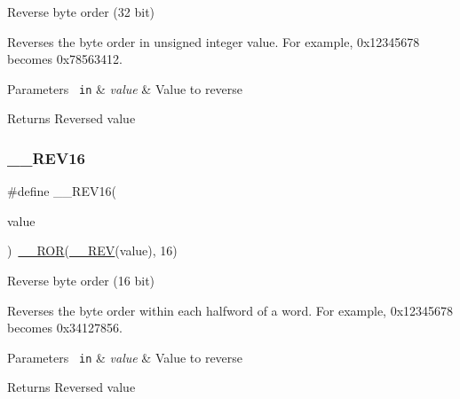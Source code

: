 Reverse byte order (32 bit) 

Reverses the byte order in unsigned integer value. For example, 0x12345678 becomes 0x78563412. 
\begin{DoxyParams}[1]{Parameters}
\mbox{\texttt{ in}}  & {\em value} & Value to reverse \\
\hline
\end{DoxyParams}
\begin{DoxyReturn}{Returns}
Reversed value 
\end{DoxyReturn}
\mbox{\label{group___c_m_s_i_s___core___instruction_interface_gad35497777af37e7809271b5e6f9510ba}} 
\subsubsection{\texorpdfstring{\_\_REV16}{\_\_REV16}\hspace{0.1cm}{\footnotesize\ttfamily [1/2]}}
{\footnotesize\ttfamily \#define \+\_\+\+\_\+\+R\+E\+V16(\begin{DoxyParamCaption}\item[{}]{value }\end{DoxyParamCaption})~\mbox{\hyperlink{group___c_m_s_i_s___core___instruction_interface_gab16acb6456176f1e87a4f2724c2b6028}{\+\_\+\+\_\+\+R\+OR}}(\mbox{\hyperlink{group___c_m_s_i_s___core___instruction_interface_gadb92679719950635fba8b1b954072695}{\+\_\+\+\_\+\+R\+EV}}(value), 16)}



Reverse byte order (16 bit) 

Reverses the byte order within each halfword of a word. For example, 0x12345678 becomes 0x34127856. 
\begin{DoxyParams}[1]{Parameters}
\mbox{\texttt{ in}}  & {\em value} & Value to reverse \\
\hline
\end{DoxyParams}
\begin{DoxyReturn}{Returns}
Reversed value 
\end{DoxyReturn}
\mbox{\label{group___c_m_s_i_s___core___instruction_interface_gad35497777af37e7809271b5e6f9510ba}} 
